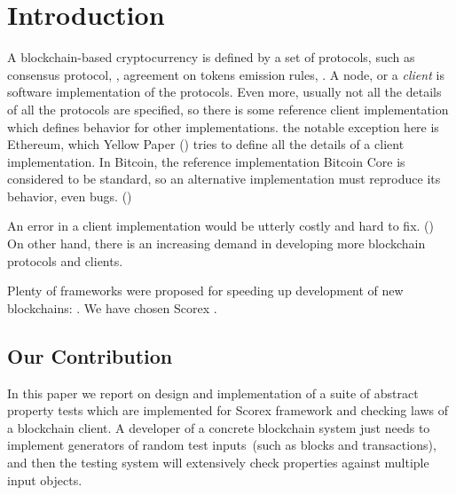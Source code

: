 
\section{Introduction}

A blockchain-based cryptocurrency is defined by a set of protocols, such as consensus protocol, , agreement on tokens emission rules, . A node, or a {\em client} is software implementation of the protocols. Even more, usually not all the details of all the protocols are specified, so there is some reference client implementation which defines behavior for other implementations. the notable exception here is Ethereum, which Yellow Paper () tries to define all the details of a client implementation. In Bitcoin, the reference implementation Bitcoin Core is considered to be standard, so an alternative implementation must reproduce its behavior, even bugs. ()

An error in a client implementation would be utterly costly and hard to fix. () On other hand, there is an increasing demand in developing more blockchain protocols and clients. 

Plenty of frameworks were proposed for speeding up development of new blockchains: . We have chosen Scorex .

\subsection{Our Contribution}

In this paper we report on design and implementation of a suite of abstract property tests which are implemented for Scorex framework and checking laws of a blockchain client. A developer of a concrete blockchain system just needs to implement generators of random test inputs~(such as blocks and transactions), and then the testing system will extensively check properties against multiple input objects.
